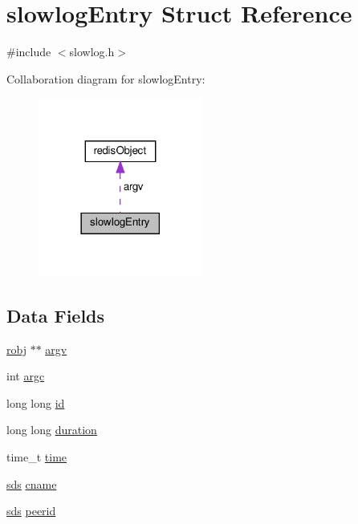 \hypertarget{structslowlog_entry}{}\section{slowlog\+Entry Struct Reference}
\label{structslowlog_entry}


{\ttfamily \#include $<$slowlog.\+h$>$}



Collaboration diagram for slowlog\+Entry\+:
\nopagebreak
\begin{figure}[H]
\begin{center}
\leavevmode
\includegraphics[width=153pt]{structslowlog_entry__coll__graph}
\end{center}
\end{figure}
\subsection*{Data Fields}
\begin{DoxyCompactItemize}
\item 
\hyperlink{server_8h_a540f174d2685422fbd7d12e3cd44c8e2}{robj} $\ast$$\ast$ \hyperlink{structslowlog_entry_a5c75dd3cb8eb8a3f5be7d4fdf48a9ef9}{argv}
\item 
int \hyperlink{structslowlog_entry_ad1447518f4372828b8435ae82e48499e}{argc}
\item 
long long \hyperlink{structslowlog_entry_ab87bfb64728d3251718dbf51ef534b60}{id}
\item 
long long \hyperlink{structslowlog_entry_a09a525985f9f5a8746da229206f0e1db}{duration}
\item 
time\+\_\+t \hyperlink{structslowlog_entry_ab842bdb7d02be824fb48613032b4ff36}{time}
\item 
\hyperlink{sds_8h_ad69abac3df4532879db9642c95f5ef6f}{sds} \hyperlink{structslowlog_entry_a8075cc6220751389639cec9aec6d9195}{cname}
\item 
\hyperlink{sds_8h_ad69abac3df4532879db9642c95f5ef6f}{sds} \hyperlink{structslowlog_entry_a1c0771287014c17317f1d2536fea4427}{peerid}
\end{DoxyCompactItemize}


